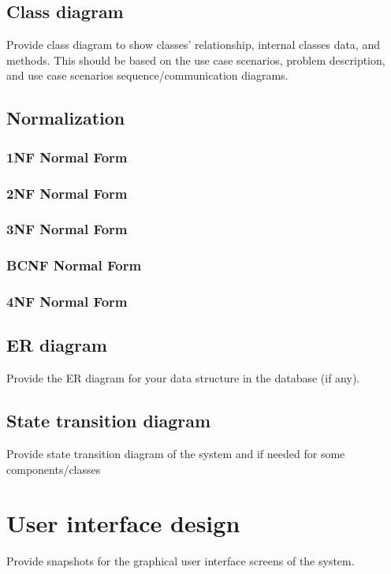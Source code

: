 \subsection{Class diagram}
Provide class diagram to show classes’ relationship, internal classes data, and methods. This should be based on the use case scenarios, problem description, and use case scenarios sequence/communication diagrams.

\subsection{Normalization}

\subsubsection{1NF Normal Form}

\subsubsection{2NF Normal Form}

\subsubsection{3NF Normal Form}

\subsubsection{BCNF Normal Form}

\subsubsection{4NF Normal Form}

\subsection{ER diagram}

Provide the ER diagram for your data structure in the database (if any).

\subsection{State transition diagram}

Provide state transition diagram of the system and if needed for some components/classes

\section{User interface design}

Provide snapshots for the graphical user interface screens of the system.


